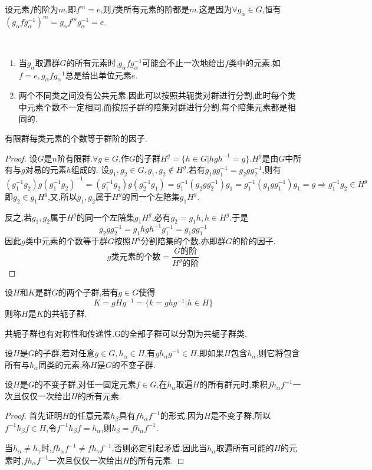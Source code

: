 设元素$f$的阶为$m$,即$f^m=e$,则$f$类所有元素的阶都是$m$.这是因为$\forall g_\alpha \in G$,恒有
    $(g_\alpha fg_\alpha^{-1})^m=g_\alpha f^m g_\alpha^{-1}=e$. 
    \begin{remark}\ \\
 \begin{enumerate}
    \item  当$g_\alpha$取遍群$G$的所有元素时,$g_\alpha fg_\alpha^{-1}$可能会不止一次地给出$f$类中的元素.如$f=e,g_\alpha fg^{-1}_\alpha$总是给出单位元素$e$.
\item 两个不同类之间没有公共元素.因此可以按照共轭类对群进行分割,此时每个类中元素个数不一定相同,而按照子群的陪集对群进行分割,每个陪集元素都是相同的.
 \end{enumerate}
    \end{remark}
\begin{theorem}
    有限群每类元素的个数等于群阶的因子.
\end{theorem}
\begin{proof}
    设$G$是$n$阶有限群.$\forall g \in G$,作$G$的子群$H^g=\{h\in G|hgh^{-1}=g\}$.$H^g$是由$G$中所有与$g$对易的元素$h$组成的.
    设$g_1,g_2\in G,g_1,g_2\notin H^g$.若有$g_1gg_1^{-1}=g_2gg_2^{-1}$,则有
    $$(g_1^{-1}g_2)g(g_1^{-1}g_2)^{-1}=(g_1^{-1}g_2)g(g_2^{-1}g_1)=g_1^{-1}(g_2gg_2^{-1})g_1=g_1^{-1}(g_1gg_1^{-1})g_1=g\Rightarrow g_1^{-1}g_2 \in H^g$$
    即$g_2 \in g_1 H^g$,又,所以$g_1,g_2$属于$H^g$的同一个左陪集$g_1H^g$.

 反之,若$g_1,g_2$属于$H^g$的同一个左陪集$g_1H^g$,必有$g_2=g_1h,h\in H^g$.于是
 $$ g_2gg_2^{-1}=g_1hgh^{-1}g_1^{-1}=g_1gg_1^{-1}$$
因此$g$类中元素的个数等于群$G$按照$H^g$分割陪集的个数,亦即群$G$的阶的因子.
$$g\text{类元素的个数}=\dfrac{G\text{的阶}}{H^g\text{的阶}}$$
\end{proof}
\begin{definition}[共轭子群]
设$H$和$K$是群$G$的两个子群,若有$g\in G$使得
$$K=gHg^{-1}=\{k=ghg^{-1}|h \in H\}$$
则称$H$是$K$的共轭子群.
\end{definition}
共轭子群也有对称性和传递性.G的全部子群可以分割为共轭子群类.
\begin{definition}[不变子群]
    设$H$是$G$的子群,若对任意$g\in G, h_\alpha \in H$,有$gh_\alpha g^{-1}\in H$.即如果$H$包含$h_\alpha$,则它将包含所有与$h_\alpha$同类的元素,称$H$是$G$的不变子群.
\end{definition}
\begin{theorem}
    设$H$是$G$的不变子群,对任一固定元素$f\in G$,在$h_\alpha$取遍$H$的所有群元时,乘积$fh_\alpha f^{-1}$一次且仅仅一次给出$H$的所有元素.
\end{theorem}
\begin{proof}
    首先证明$H$的任意元素$h_\beta$具有$fh_\alpha f^{-1}$的形式.因为$H$是不变子群,所以$f^{-1}h_\beta f \in H$,令$f^{-1}h_\beta f =h_\alpha$,则$h_\beta =fh_\alpha f^{-1}$.

    当$h_\alpha \neq h_\gamma$时,$fh_\alpha f^{-1} \neq fh_\gamma f^{-1}$,否则必定引起矛盾.因此当$h_\alpha$取遍所有可能的$H$的元素时,$fh_\alpha f^{-1}$一次且仅仅一次给出$H$的所有元素.
\end{proof}

